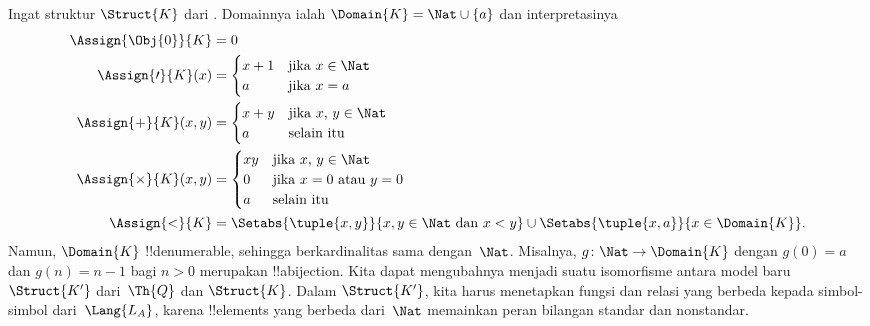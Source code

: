 \documentclass[../../../include/open-logic-section]{subfiles}
\begin{document}
\begin{ex}
Ingat struktur $\Struct{K}$ dari . Domainnya ialah
$\Domain{K} = \Nat \cup \{a\}$ dan interpretasinya
\begin{align*}
  \Assign{\Obj{0}}{K} & = 0\\
  \Assign{\prime}{K}(x) & =
  \begin{cases}
    x+1 & \text{jika $x\in \Nat$}\\
    a & \text{jika $x = a$}
  \end{cases}\\
  \Assign{+}{K}(x, y) & =
  \begin{cases}
    x+y & \text{jika $x$, $y \in\Nat$}\\
    a & \text{selain itu}
  \end{cases}\\
  \Assign{\times}{K}(x, y) & =
  \begin{cases}
    xy & \text{jika $x$, $y \in\Nat$}\\
    0 & \text{jika $x=0$ atau $y=0$}\\
    a & \text{selain itu}\\
  \end{cases}\\
  \Assign{<}{K} & =
  \Setabs{\tuple{x,y}}{x, y \in \Nat \text{ dan } x<y} \cup
  \Setabs{\tuple{x,a}}{x \in \Domain{K}}.
\end{align*}
Namun, $\Domain{K}$ !!{denumerable}, sehingga berkardinalitas sama
dengan~$\Nat$. Misalnya, $g\colon \Nat \to \Domain{K}$ dengan
$g(0) = a$ dan $g(n) = n-1$ bagi $n>0$ merupakan !!a{bijection}. Kita dapat
mengubahnya menjadi suatu isomorfisme antara model baru~$\Struct{K'}$
dari~$\Th{Q}$ dan $\Struct{K}$. Dalam $\Struct{K'}$, kita harus menetapkan
fungsi dan relasi yang berbeda kepada simbol-simbol dari~$\Lang{L_A}$, karena
!!{element}s yang berbeda dari~$\Nat$ memainkan peran bilangan standar dan
nonstandar.


\end{ex}
\end{document}
